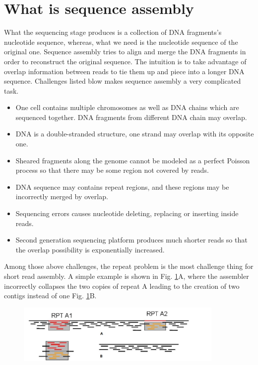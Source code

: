 \documentclass{article}
\begin{document}
\section{What is sequence assembly}
What the sequencing stage produces is a collection of DNA fragments's nucleotide sequence, whereas, what we need is the nucleotide sequence of the original one. Sequence assembly tries to align and merge the DNA fragments in order to reconstruct the original sequence. The intuition is to take advantage of overlap information between reads to tie them up and piece into a longer DNA sequence. Challenges listed blow makes sequence assembly a very complicated task.\\
\begin{itemize}
 \item One cell contains multiple chromosomes as well as DNA chains which are sequenced together. DNA fragments from different DNA chain may overlap.
 \item DNA is a double-stranded structure, one strand may overlap with its opposite one.
 \item Sheared fragments along the genome cannot be modeled as a perfect Poisson process so that there may be some region not covered by reads. 
 \item DNA sequence may contains repeat regions, and these regions may be incorrectly merged by overlap.
 \item Sequencing errors causes nucleotide deleting, replacing or inserting inside reads.
 \item Second generation sequencing platform produces much shorter reads so that the overlap possibility is exponentially increased. 
\end{itemize}
Among those above challenges, the repeat problem is the most challenge thing for short read assembly. A simple example is shown in Fig. \ref{repeat_example}A, where the assembler incorrectly collapses the two copies of repeat A leading to the creation of two contigs instead of one Fig. \ref{repeat_example}B.\\
\begin{figure}[ht]
  \centering
  \includegraphics[width=10cm]{Figure4.jpg}\\
  \caption{}\label{repeat_example}
\end{figure}
\end{document}

